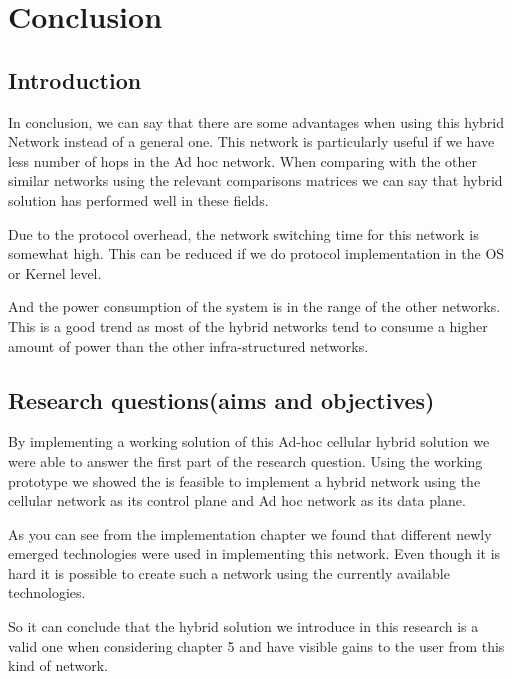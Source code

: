 \chapter[Conclusion]{Conclusion}

\section{Introduction}
In conclusion, we can say that there are some advantages when using this hybrid Network instead of a general one. This network is particularly useful if we have less number of hops in the Ad hoc network. When comparing with the other similar networks using the relevant comparisons matrices we can say that hybrid solution has performed well in these fields.

Due to the protocol overhead, the network switching time for this network is somewhat high. This can be reduced if we do protocol implementation in the OS or Kernel level.

And the power consumption of the system is in the range of the other networks. This is a good trend as most of the hybrid networks tend to consume a higher amount of power than the other infra-structured networks. 

\vspace{0.7cm}

\section{Research questions(aims and objectives)}
\vspace{0.7cm}
By implementing a working solution of this Ad-hoc cellular hybrid solution we were able to answer the first part of the research question. Using the working prototype we showed the is feasible to implement a hybrid network using the cellular network as its control plane and Ad hoc network as its data plane. 

As you can see from the implementation chapter we found that different newly emerged technologies were used in implementing this network. Even though it is hard it is possible to create such a network using the currently available technologies.

\clearpage

So it can conclude that the hybrid solution we introduce in this research is a valid one when considering chapter 5 and have visible gains to the user from this kind of network.

\vspace{0.7cm}


